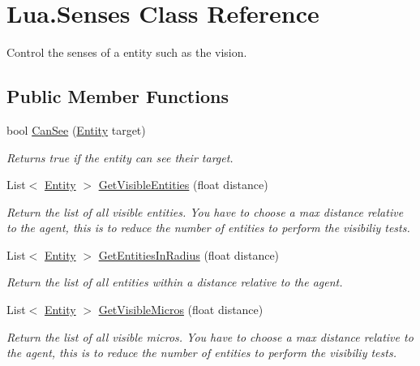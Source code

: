 \hypertarget{class_lua_1_1_senses}{}\section{Lua.\+Senses Class Reference}
\label{class_lua_1_1_senses}


Control the senses of a entity such as the vision.  


\subsection*{Public Member Functions}
\begin{DoxyCompactItemize}
\item 
bool \mbox{\hyperlink{class_lua_1_1_senses_a57bce39cc60df494445e5869f4dec72b}{Can\+See}} (\mbox{\hyperlink{class_lua_1_1_entity}{Entity}} target)
\begin{DoxyCompactList}\small\item\em Returns true if the entity can see their target. \end{DoxyCompactList}\item 
List$<$ \mbox{\hyperlink{class_lua_1_1_entity}{Entity}} $>$ \mbox{\hyperlink{class_lua_1_1_senses_a46bf9d49d69a4c9e8bc9c831e19c8a22}{Get\+Visible\+Entities}} (float distance)
\begin{DoxyCompactList}\small\item\em Return the list of all visible entities. You have to choose a max distance relative to the agent, this is to reduce the number of entities to perform the visibiliy tests. \end{DoxyCompactList}\item 
List$<$ \mbox{\hyperlink{class_lua_1_1_entity}{Entity}} $>$ \mbox{\hyperlink{class_lua_1_1_senses_a47a6e9f98ffd7a583fc308cb805dcf9d}{Get\+Entities\+In\+Radius}} (float distance)
\begin{DoxyCompactList}\small\item\em Return the list of all entities within a distance relative to the agent. \end{DoxyCompactList}\item 
List$<$ \mbox{\hyperlink{class_lua_1_1_entity}{Entity}} $>$ \mbox{\hyperlink{class_lua_1_1_senses_a55e0ed7d6a4383d1f9e552b3be07bcee}{Get\+Visible\+Micros}} (float distance)
\begin{DoxyCompactList}\small\item\em Return the list of all visible micros. You have to choose a max distance relative to the agent, this is to reduce the number of entities to perform the visibiliy tests. \end{DoxyCompactList}\item 

\end{DoxyCompactItemize}
